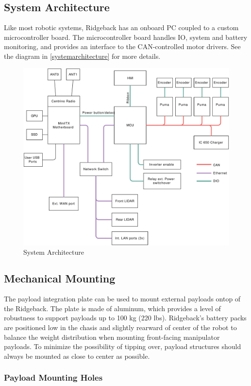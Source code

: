 \documentclass[]{clearpath-latex/clearpath-manual}
\begin{document}
\subsection{System Architecture}

Like most robotic systems, Ridgeback has an onboard PC coupled to a custom microcontroller board. The microcontroller board handles IO, system and battery monitoring, and provides an interface to the CAN-controlled motor drivers. See the diagram in \autoref{systemarchitecture} for more details.

\begin{figure}[!htb]
  \centering
  \includegraphics[width=0.75\linewidth]{ridgeback-logic-conn.pdf}
  \caption{System Architecture}
  \label{systemarchitecture}
\end{figure}

\subsection{Mechanical Mounting}
\label{mechanical}

The payload integration plate can be used to mount external payloads ontop of the Ridgeback.   The plate is made of aluminum, which provides a level of robustness to support payloads up to 100 kg (220 lbs).   Ridgeback's battery packs are positioned low in the chasis and slightly rearward of center of the robot to balance the weight distribution when mounting front-facing manipulator payloads. To minimize the possibility of tipping over, payload structures should always be mounted as close to center as possible.

\subsubsection{Payload Mounting Holes}
\end{document}
